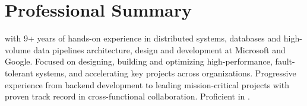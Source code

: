 \section{Professional Summary}
\small{\POSITION{} with 9+ years of hands-on experience in distributed systems, databases and
    high-volume data pipelines architecture, design and development at Microsoft and Google.
    Focused on designing, building and optimizing high-performance, fault-tolerant systems, and
    accelerating key projects across organizations. Progressive experience from backend development
    to leading mission-critical projects with proven track record in cross-functional collaboration.
    Proficient in \LanguagesOrder\MainTechnologies.}
